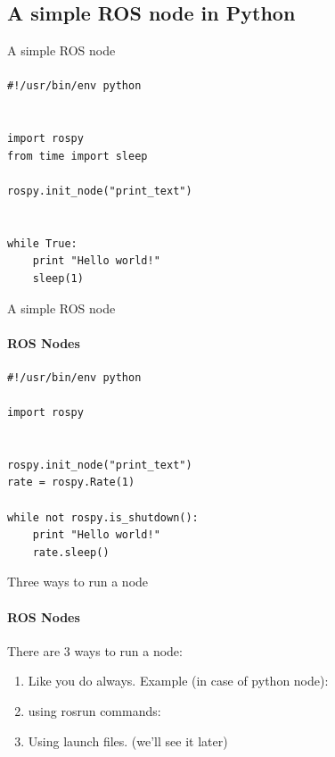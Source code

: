 \documentclass{beamer}
\begin{document}
\subsection{A simple ROS node in Python}

\begin{frame}[fragile]{A simple ROS node}
    \framesubtitle{}
    \begin{lstlisting}
#!/usr/bin/env python


import rospy
from time import sleep

rospy.init_node("print_text")


while True:
    print "Hello world!"
    sleep(1)
    \end{lstlisting}
\end{frame}


\begin{frame}[fragile]{A simple ROS node}
    \framesubtitle{ROS Nodes}
\begin{lstlisting}
#!/usr/bin/env python

import rospy


rospy.init_node("print_text")  
rate = rospy.Rate(1)

while not rospy.is_shutdown():
    print "Hello world!"
    rate.sleep()
\end{lstlisting}
\end{frame}

\begin{frame}{Three ways to run a node}
    \framesubtitle{ROS Nodes}
    
    There are 3 ways to run a node:
    \begin{enumerate}
        \item Like you do always. Example (in case of python node):
                \begin{terminal}
                \color{green} 
                \end{terminal}
        \item using rosrun commands:
        \begin{terminal}
        \color{green} 
        \end{terminal}
        
        \item Using launch files. \tiny{(we'll see it later)}

    \end{enumerate}
\end{frame}
\end{document}
